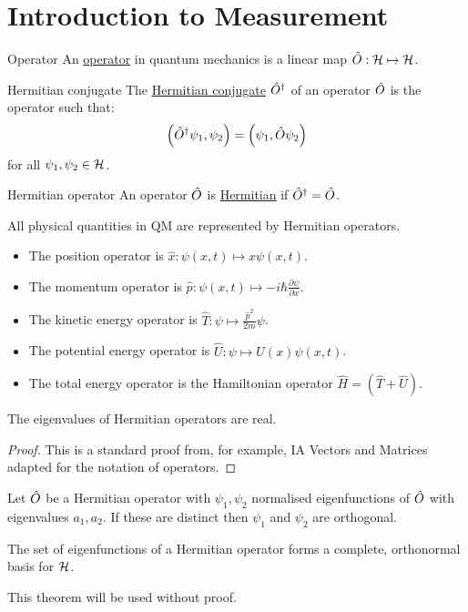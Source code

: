 \documentclass[../Main.tex]{subfiles}
\begin{document}
\section{Introduction to Measurement}
\begin{definition}{Operator}
    An \underline{operator} in quantum mechanics is a linear map $\hat{O} : \mathcal{H} \mapsto \mathcal{H}$.
\end{definition}
\begin{definition}{Hermitian conjugate}
    The \underline{Hermitian conjugate} $\hat{O}^\dagger$ of an operator $\hat{O}$ is the operator such that:
    \begin{equation*}
        \left(\hat{O}^\dagger \psi_1,\psi_2\right) = \left(\psi_1,\hat{O}\psi_2\right)
    \end{equation*}
    for all $\psi_1, \psi_2 \in \mathcal{H}$.
\end{definition}
\begin{definition}{Hermitian operator}
    An operator $\hat{O}$ is \underline{Hermitian} if $\hat{O}^\dagger = \hat{O}$.
\end{definition}
\begin{remark}
    All physical quantities in QM are represented by Hermitian operators.
\end{remark}
\begin{itemize}
    \item The position operator is $\hat{x} : \psi(x, t) \mapsto x\psi(x, t)$.
    \item The momentum operator is $\hat{p} : \psi(x, t) \mapsto -i\hbar \frac{\partial \psi}{\partial x}$.
    \item The kinetic energy operator is $\hat{T} : \psi \mapsto \frac{\hat{p}^2}{2m}\psi$.
    \item The potential energy operator is $\hat{U} : \psi \mapsto U(x)\psi(x, t)$.
    \item The total energy operator is the Hamiltonian operator $\hat{H} = (\hat{T} + \hat{U})$.
\end{itemize}
\begin{proposition}
    The eigenvalues of Hermitian operators are real.
    \label{propMeasurementReal}
\end{proposition}
\begin{proof}
    This is a standard proof from, for example, IA Vectors and Matrices adapted for the notation of operators.
\end{proof}
\begin{proposition}
    Let $\hat{O}$ be a Hermitian operator with $\psi_1, \psi_2$ normalised eigenfunctions of $\hat{O}$ with eigenvalues $a_1, a_2$. If these are distinct then $\psi_1$ and $\psi_2$ are orthogonal.
    \label{propOrthogonalEigenfunctions}
\end{proposition}
\begin{theorem}
    The set of eigenfunctions of a Hermitian operator forms a complete, orthonormal basis for $\mathcal{H}$.
    \label{thmEigenfunctionsFormBasis}
\end{theorem}
This theorem will be used without proof.
\end{document}
